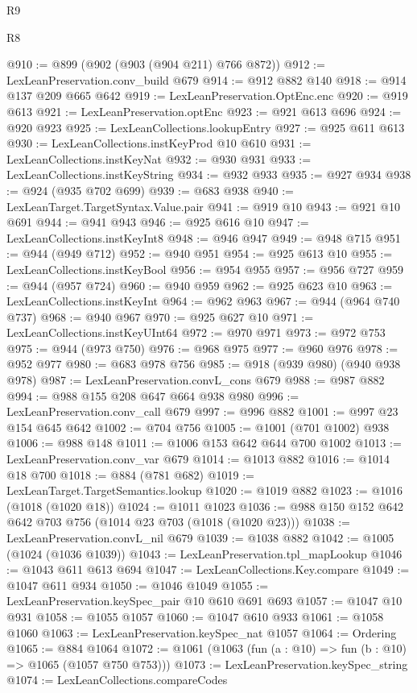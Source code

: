 \begin{lexlean}{R9}
\begin{lexlean}{R8}
\begin{coremodule}
{{{{{{{{{{{{{{{{{{{{{{{{{{{{{{{{{{{{{{{{@910 := @899 (@902 (@903 (@904 @211) @766 @872))
@912 := LexLeanPreservation.conv_build @679
@914 := @912 @882 @140
@918 := @914 @137 @209 @665 @642
@919 := LexLeanPreservation.OptEnc.enc
@920 := @919 @613
@921 := LexLeanPreservation.optEnc
@923 := @921 @613 @696
@924 := @920 @923
@925 := LexLeanCollections.lookupEntry
@927 := @925 @611 @613
@930 := LexLeanCollections.instKeyProd @10 @610
@931 := LexLeanCollections.instKeyNat
@932 := @930 @931
@933 := LexLeanCollections.instKeyString
@934 := @932 @933
@935 := @927 @934
@938 := @924 (@935 @702 @699)
@939 := @683 @938
@940 := LexLeanTarget.TargetSyntax.Value.pair
@941 := @919 @10
@943 := @921 @10 @691
@944 := @941 @943
@946 := @925 @616 @10
@947 := LexLeanCollections.instKeyInt8
@948 := @946 @947
@949 := @948 @715
@951 := @944 (@949 @712)
@952 := @940 @951
@954 := @925 @613 @10
@955 := LexLeanCollections.instKeyBool
@956 := @954 @955
@957 := @956 @727
@959 := @944 (@957 @724)
@960 := @940 @959
@962 := @925 @623 @10
@963 := LexLeanCollections.instKeyInt
@964 := @962 @963
@967 := @944 (@964 @740 @737)
@968 := @940 @967
@970 := @925 @627 @10
@971 := LexLeanCollections.instKeyUInt64
@972 := @970 @971
@973 := @972 @753
@975 := @944 (@973 @750)
@976 := @968 @975
@977 := @960 @976
@978 := @952 @977
@980 := @683 @978 @756
@985 := @918 (@939 @980) (@940 @938 @978)
@987 := LexLeanPreservation.convL_cons @679
@988 := @987 @882
@994 := @988 @155 @208 @647 @664 @938 @980
@996 := LexLeanPreservation.conv_call @679
@997 := @996 @882
@1001 := @997 @23 @154 @645 @642
@1002 := @704 @756
@1005 := @1001 (@701 @1002) @938
@1006 := @988 @148
@1011 := @1006 @153 @642 @644 @700 @1002
@1013 := LexLeanPreservation.conv_var @679
@1014 := @1013 @882
@1016 := @1014 @18 @700
@1018 := @884 (@781 @682)
@1019 := LexLeanTarget.TargetSemantics.lookup
@1020 := @1019 @882
@1023 := @1016 (@1018 (@1020 @18))
@1024 := @1011 @1023
@1036 := @988 @150 @152 @642 @642 @703 @756 (@1014 @23 @703 (@1018 (@1020 @23)))
@1038 := LexLeanPreservation.convL_nil @679
@1039 := @1038 @882
@1042 := @1005 (@1024 (@1036 @1039))
@1043 := LexLeanPreservation.tpl_mapLookup
@1046 := @1043 @611 @613 @694
@1047 := LexLeanCollections.Key.compare
@1049 := @1047 @611 @934
@1050 := @1046 @1049
@1055 := LexLeanPreservation.keySpec_pair @10 @610 @691 @693
@1057 := @1047 @10 @931
@1058 := @1055 @1057
@1060 := @1047 @610 @933
@1061 := @1058 @1060
@1063 := LexLeanPreservation.keySpec_nat @1057
@1064 := Ordering
@1065 := @884 @1064
@1072 := @1061 (@1063 (fun (a : @10) => fun (b : @10) => @1065 (@1057 @750 @753)))
@1073 := LexLeanPreservation.keySpec_string
@1074 := LexLeanCollections.compareCodes
}}}}}}}}}}}}}}}}}}}}}}}}}}}}}}}}}}}}}}}}
\end{coremodule}
\end{lexlean}
\end{lexlean}
